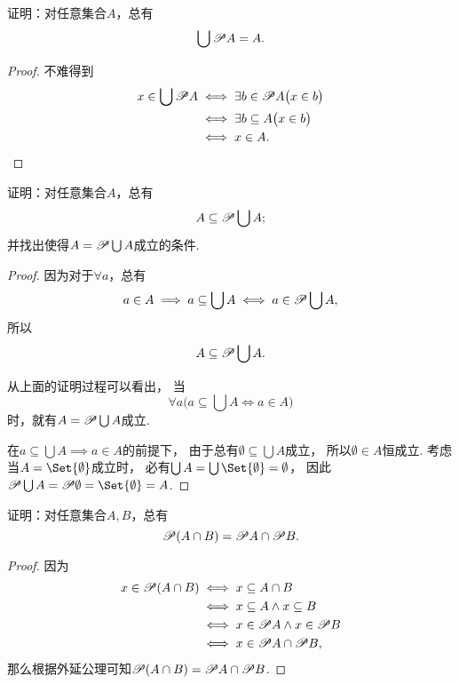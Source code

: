\begin{example}
证明：对任意集合\(A\)，总有
\begin{equation}\label{equation:集合论.集的幂集的并等于集}
	\bigcup \mathscr{P} A = A.
\end{equation}
\begin{proof}
不难得到
\begin{align*}
	x \in \bigcup \mathscr{P} A
	&\iff
	\exists b \in \mathscr{P} A \bigl( x \in b \bigr) \\
	&\iff
	\exists b \subseteq A \bigl( x \in b \bigr) \\
	&\iff
	x \in A.
	\qedhere
\end{align*}
\end{proof}
\end{example}


\begin{example}
证明：对任意集合\(A\)，总有
\begin{equation}\label{equation:集合论.系的并的幂集包含系}
	A \subseteq \mathscr{P} \bigcup A;
\end{equation}
并找出使得\(A = \mathscr{P} \bigcup A\)成立的条件.
\begin{proof}
因为对于\(\forall a\)，总有\[
	a \in A
	\implies
	a \subseteq \bigcup A
	\iff
	a \in \mathscr{P} \bigcup A,
\]
所以\[
	A \subseteq \mathscr{P} \bigcup A.
\]

从上面的证明过程可以看出，
当\[
	\forall a \bigl( a \subseteq \bigcup A \iff a \in A \bigr)
\]时，就有\(A = \mathscr{P} \bigcup A\)成立.

在\(a \subseteq \bigcup A \implies a \in A\)的前提下，
由于总有\(\emptyset \subseteq \bigcup A\)成立，
所以\(\emptyset \in A\)恒成立.
考虑当\(A = \Set{\emptyset}\)成立时，
必有\(\bigcup A = \bigcup\Set{\emptyset} = \emptyset\)，
因此\(\Powerset \bigcup A = \Powerset \emptyset = \Set{\emptyset} = A\).
\end{proof}
\end{example}

\begin{example}
证明：对任意集合\(A,B\)，总有
\begin{equation}
	\mathscr{P} (A \cap B) = \mathscr{P} A \cap \mathscr{P} B.
\end{equation}
\begin{proof}
因为\begin{align*}
	x \in \mathscr{P} (A \cap B)
	&\iff x \subseteq A \cap B \\
	&\iff x \subseteq A \land x \subseteq B \\
	&\iff x \in \mathscr{P} A \land x \in \mathscr{P} B \\
	&\iff x \in \mathscr{P} A \cap \mathscr{P} B,
\end{align*}
那么根据外延公理可知\(\mathscr{P} (A \cap B) = \mathscr{P} A \cap \mathscr{P} B\).
\end{proof}
\end{example}


